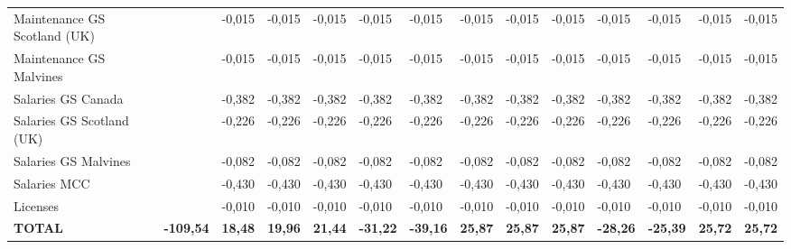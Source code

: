 \begin{landscape}
\begin{table}[]
{\begin{tabular}{|l|l|l|l|l|l|l|l|l|l|l|l|l|l|}
Maintenance GS Scotland (UK)                                                           &                  & -0,015          & -0,015          & -0,015          & -0,015          & -0,015          & -0,015          & -0,015          & -0,015          & -0,015          & -0,015           & -0,015           & -0,015           \\
Maintenance GS Malvines                                                                &                  & -0,015          & -0,015          & -0,015          & -0,015          & -0,015          & -0,015          & -0,015          & -0,015          & -0,015          & -0,015           & -0,015           & -0,015           \\
Salaries GS Canada                                                                     &                  & -0,382          & -0,382          & -0,382          & -0,382          & -0,382          & -0,382          & -0,382          & -0,382          & -0,382          & -0,382           & -0,382           & -0,382           \\
Salaries GS Scotland (UK)                                                              &                  & -0,226          & -0,226          & -0,226          & -0,226          & -0,226          & -0,226          & -0,226          & -0,226          & -0,226          & -0,226           & -0,226           & -0,226           \\
Salaries GS Malvines                                                                   &                  & -0,082          & -0,082          & -0,082          & -0,082          & -0,082          & -0,082          & -0,082          & -0,082          & -0,082          & -0,082           & -0,082           & -0,082           \\
Salaries MCC                                                                           &                  & -0,430          & -0,430          & -0,430          & -0,430          & -0,430          & -0,430          & -0,430          & -0,430          & -0,430          & -0,430           & -0,430           & -0,430           \\
Licenses                                                                               &                  & -0,010          & -0,010          & -0,010          & -0,010          & -0,010          & -0,010          & -0,010          & -0,010          & -0,010          & -0,010           & -0,010           & -0,010           \\
\textbf{TOTAL}                                                                         & \textbf{-109,54} & \textbf{18,48}  & \textbf{19,96}  & \textbf{21,44}  & \textbf{-31,22} & \textbf{-39,16} & \textbf{25,87}  & \textbf{25,87}  & \textbf{25,87}  & \textbf{-28,26} & \textbf{-25,39}  & \textbf{25,72}   & \textbf{25,72}   

\end{tabular}}
\end{table}
\end{landscape}
